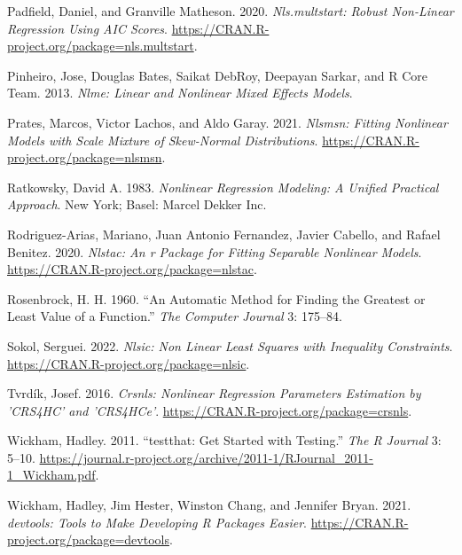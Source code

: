 \documentclass[
]{article}
\newlength{\cslhangindent}
\newlength{\cslentryspacingunit} %
\newenvironment{CSLReferences}[2] %
 {%
  \setlength{\parindent}{0pt}
  \ifodd #1
  \let\oldpar\par
  \def\par{\hangindent=\cslhangindent\oldpar}
  \fi
  \setlength{\parskip}{#2\cslentryspacingunit}
 }%
 {}
\begin{document}
\begin{CSLReferences}{1}{0}
\leavevmode{}%
Padfield, Daniel, and Granville Matheson. 2020. \emph{Nls.multstart:
Robust Non-Linear Regression Using AIC Scores}.
\url{https://CRAN.R-project.org/package=nls.multstart}.

\leavevmode{}%
Pinheiro, Jose, Douglas Bates, Saikat DebRoy, Deepayan Sarkar, and R
Core Team. 2013. \emph{Nlme: Linear and Nonlinear Mixed Effects Models}.

\leavevmode{}%
Prates, Marcos, Victor Lachos, and Aldo Garay. 2021. \emph{Nlsmsn:
Fitting Nonlinear Models with Scale Mixture of Skew-Normal
Distributions}. \url{https://CRAN.R-project.org/package=nlsmsn}.

\leavevmode{}%
Ratkowsky, David A. 1983. \emph{Nonlinear Regression Modeling: A Unified
Practical Approach}. New York; Basel: Marcel Dekker Inc.

\leavevmode{}%
Rodriguez-Arias, Mariano, Juan Antonio Fernandez, Javier Cabello, and
Rafael Benitez. 2020. \emph{Nlstac: An r Package for Fitting Separable
Nonlinear Models}. \url{https://CRAN.R-project.org/package=nlstac}.

\leavevmode{}%
Rosenbrock, H. H. 1960. {``An Automatic Method for Finding the Greatest
or Least Value of a Function.''} \emph{The Computer Journal} 3: 175--84.

\leavevmode{}%
Sokol, Serguei. 2022. \emph{Nlsic: Non Linear Least Squares with
Inequality Constraints}. \url{https://CRAN.R-project.org/package=nlsic}.

\leavevmode{}%
Tvrdík, Josef. 2016. \emph{Crsnls: Nonlinear Regression Parameters
Estimation by 'CRS4HC' and 'CRS4HCe'}.
\url{https://CRAN.R-project.org/package=crsnls}.

\leavevmode{}%
Wickham, Hadley. 2011. {``{testthat: Get Started with Testing}.''}
\emph{The R Journal} 3: 5--10.
\url{https://journal.r-project.org/archive/2011-1/RJournal_2011-1_Wickham.pdf}.

\leavevmode{}%
Wickham, Hadley, Jim Hester, Winston Chang, and Jennifer Bryan. 2021.
\emph{{devtools: Tools to Make Developing R Packages Easier}}.
\url{https://CRAN.R-project.org/package=devtools}.

\end{CSLReferences}
\end{document}
